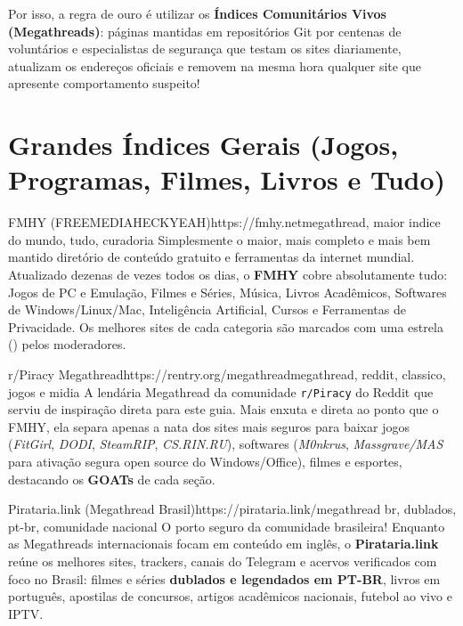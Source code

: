 \documentclass{pousadaguide}
\begin{document}
Por isso, a regra de ouro é utilizar os \textbf{Índices Comunitários Vivos (Megathreads)}: páginas mantidas em repositórios Git por centenas de voluntários e especialistas de segurança que testam os sites diariamente, atualizam os endereços oficiais e removem na mesma hora qualquer site que apresente comportamento suspeito!

\section{Grandes Índices Gerais (Jogos, Programas, Filmes, Livros e Tudo)}

\begin{ferramenta}[goat,logo=fmhy]{FMHY (FREEMEDIAHECKYEAH)}{https://fmhy.net}{megathread, maior indice do mundo, tudo, curadoria}
Simplesmente o maior, mais completo e mais bem mantido diretório de conteúdo gratuito e ferramentas da internet mundial. Atualizado dezenas de vezes todos os dias, o \textbf{FMHY} cobre absolutamente tudo: Jogos de PC e Emulação, Filmes e Séries, Música, Livros Acadêmicos, Softwares de Windows/Linux/Mac, Inteligência Artificial, Cursos e Ferramentas de Privacidade. Os melhores sites de cada categoria são marcados com uma estrela (\faStar) pelos moderadores. 
\end{ferramenta}

\begin{ferramenta}[goat,logo=reddit]{r/Piracy Megathread}{https://rentry.org/megathread}{megathread, reddit, classico, jogos e midia}
A lendária Megathread da comunidade \texttt{r/Piracy} do Reddit que serviu de inspiração direta para este guia. Mais enxuta e direta ao ponto que o FMHY, ela separa apenas a nata dos sites mais seguros para baixar jogos (\emph{FitGirl}, \emph{DODI}, \emph{SteamRIP}, \emph{CS.RIN.RU}), softwares (\emph{M0nkrus}, \emph{Massgrave/MAS} para ativação segura open source do Windows/Office), filmes e esportes, destacando os \textbf{GOATs} de cada seção. 
\end{ferramenta}

\begin{ferramenta}[goat,logo=pirataria-link]{Pirataria.link (Megathread Brasil)}{https://pirataria.link/}{megathread br, dublados, pt-br, comunidade nacional}
O porto seguro da comunidade brasileira! Enquanto as Megathreads internacionais focam em conteúdo em inglês, o \textbf{Pirataria.link} reúne os melhores sites, trackers, canais do Telegram e acervos verificados com foco no Brasil: filmes e séries \textbf{dublados e legendados em PT-BR}, livros em português, apostilas de concursos, artigos acadêmicos nacionais, futebol ao vivo e IPTV. 
\end{ferramenta}
\end{document}
